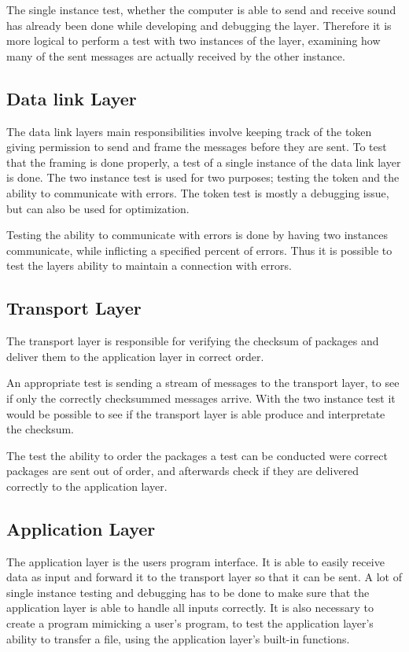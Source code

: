The single instance test, whether the computer is able to send and receive sound has already been done while developing and debugging the layer. Therefore it is more logical to perform a test with two instances of the layer, examining how many of the sent messages are actually received by the other instance.

\subsection{Data link Layer}


The data link layers main responsibilities involve keeping track of the token giving permission to send and frame the messages before they are sent. To test that the framing is done properly, a test of a single instance of the data link layer is done. The two instance test is used for two purposes; testing the token and the ability to communicate with errors. The token test is mostly a debugging issue, but can also be used for optimization.

Testing the ability to communicate with errors is done by having two instances communicate, while inflicting a specified percent of errors. Thus it is possible to test the layers ability to maintain a connection with errors.


\subsection{Transport Layer}


The transport layer is responsible for verifying the checksum of packages and deliver them to the application layer in correct order. 

An appropriate test is sending a stream of messages to the transport layer, to see if only the correctly checksummed messages arrive. With the two instance test it would be possible to see if the transport layer is able produce and interpretate the checksum. 

The test the ability to order the packages a test can be conducted were correct packages are sent out of order, and afterwards check if they are delivered correctly to the application layer.

\subsection{Application Layer}

The application layer is the users program interface. It is able to easily receive data as input and forward it to the transport layer so that it can be sent. A lot of single instance testing and debugging has to be done to make sure that the application layer is able to handle all inputs correctly. It is also necessary to create a program mimicking a user's program, to test the application layer's ability to transfer a file, using the application layer's built-in functions. 

